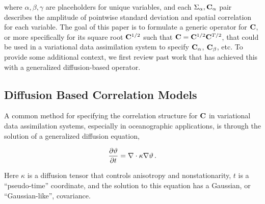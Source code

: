 where $\alpha, \beta, \gamma$ are placeholders for unique variables, and each
$\Sigma_\alpha, \mathbf{C}_\alpha$ pair describes the amplitude of pointwise standard deviation
and spatial correlation for each variable.
The goal of this paper is to formulate a generic operator for $\mathbf{C}$, or
more specifically for its square root $\mathbf{C}^{1/2}$ such that $\mathbf{C} =
\mathbf{C}^{1/2}\mathbf{C}^{T/2}$, that could be
used in a variational data assimilation system to specify $\mathbf{C}_\alpha$,
$\mathbf{C}_\beta$, etc.
To provide some additional context,
we first review past work that has achieved this with a generalized
diffusion-based operator.


\subsection{Diffusion Based Correlation Models}
\label{ssec:wc01_review}

A common method for specifying the correlation structure for
$\mathbf{C}$ in variational data assimilation systems, especially in
oceanographic applications, is through the solution of a generalized diffusion
equation,
\begin{linenomath*}\begin{equation}
    \dfrac{\partial \vartheta}{\partial t} = \nabla \cdot \kappa \nabla\vartheta \, .
    \label{eq:diffusion}
\end{equation}\end{linenomath*}
Here $\kappa$ is a diffusion tensor that controls anisotropy and
nonstationarity, $t$ is a ``pseudo-time'' coordinate, and the solution to this
equation has a Gaussian, or ``Gaussian-like'', covariance.

